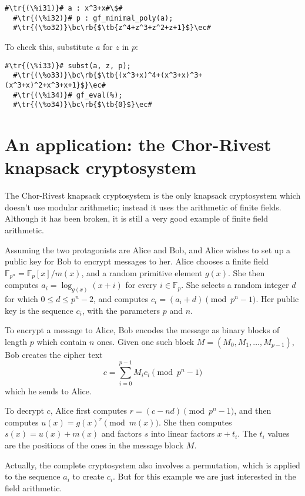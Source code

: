 \documentclass[a4paper,11pt,leqno,fleqn]{artikel3}
\newcommand{\bc}{\begin{center}}
\newcommand{\ec}{\end{center}}
\newcommand{\tr}[1]{\textcolor{red}{#1}}
\newcommand{\tb}[1]{\textcolor{blue}{#1}}
\newcommand{\rb}[1]{\raisebox{2mm}[0mm][1mm]{#1}}
\begin{document}
\vspace*{2mm}
\begin{lstlisting}[escapechar=\#]
  #\tr{(\%i31)}# a : x^3+x#\$#
  #\tr{(\%i32)}# p : gf_minimal_poly(a);
  #\tr{(\%o32)}\bc\rb{$\tb{z^4+z^3+z^2+z+1}$}\ec#
\end{lstlisting}

To check this, substitute $a$ for $z$ in $p$:

\vspace*{2mm}
\begin{lstlisting}[escapechar=\#]
  #\tr{(\%i33)}# subst(a, z, p);
  #\tr{(\%o33)}\bc\rb{$\tb{(x^3+x)^4+(x^3+x)^3+(x^3+x)^2+x^3+x+1}$}\ec#
  #\tr{(\%i34)}# gf_eval(%);
  #\tr{(\%o34)}\bc\rb{$\tb{0}$}\ec#
\end{lstlisting}


\section*{An application: the Chor-Rivest knapsack cryptosystem}

The Chor-Rivest knapsack cryptosystem is the only knapsack cryptosystem which
doesn't use modular arithmetic; instead it uses the arithmetic of finite
fields.  Although it has been broken, it is still a very good example of
finite field arithmetic.

Assuming the two protagonists are Alice and Bob, and Alice wishes to set up a
public key for Bob to encrypt messages to her.  Alice chooses a finite field
$\mathbb{F}_{p^n}=\mathbb{F}_p[x]/m(x)$, and a random primitive element $g(x)$.  She
then computes $a_i=\log_{g(x)}(x+i)$ for every $i\in\mathbb{F}_p$.  She
selects a random integer $d$ for which $0\le d\le p^n-2$, and computes
$c_i=(a_i+d)\pmod{p^n-1}$.  Her public key is the sequence $c_i$, with the
parameters $p$ and $n$.

To encrypt a message to Alice, Bob encodes the message as binary blocks of
length $p$ which contain $n$ ones.  Given one such block
$M=(M_0,M_1,\ldots,M_{p-1})$, Bob creates the cipher text
\[
c=\sum_{i=0}^{p-1}M_ic_i\pmod{p^n-1}
\]
which he sends to Alice.

To decrypt $c$, Alice first computes $r=(c-nd)\pmod{p^n-1}$, and then computes
$u(x)=g(x)^r\pmod{m(x)}$.  She then computes $s(x)=u(x)+m(x)$ and factors $s$
into linear factors $x+t_i$.  The $t_i$ values are the positions of the ones
in the message block $M$.

Actually, the complete cryptosystem also involves a permutation, which is
applied to the sequence $a_i$ to create $c_i$.  But for this example we are
just interested in the field arithmetic.
\end{document}

